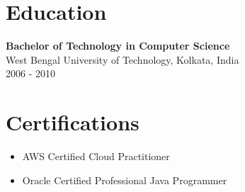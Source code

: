 \documentclass[a4paper,9pt]{article}  %
\begin{document}
\begin{multicols}{2}

\section*{Education}

\textbf{Bachelor of Technology in Computer Science} \\  
West Bengal University of Technology, Kolkata, India \\
2006 - 2010\\

\section*{Certifications}

\begin{itemize}[left=0pt, label=\textbullet, itemsep=0pt, parsep=0pt, topsep=0pt, partopsep=0pt]
    \item AWS Certified Cloud Practitioner
    \item Oracle Certified Professional Java Programmer
\end{itemize}

\end{multicols}
\end{document}
